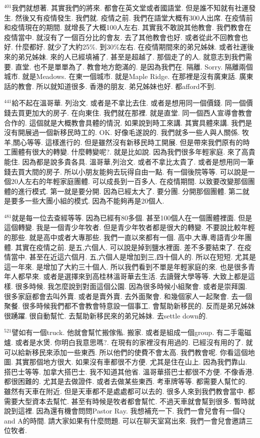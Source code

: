 \documentclass{book}
\begin{document}
$^{401}$我們就想著.
其實我們的將來.
都會在英文堂或者國語堂.
但是誰不知就有社運發生.
然後又有疫情發生.
我們就.
疫情之前.
我們在語堂大概有300人出席.
在疫情前和疫情現在的期間.
就增長了大概100人左右.
其實我不敢說其他教會.
我們教會在疫情當中.
就沒有了一個百分比的會友.
去了其他教會也好.
或者從此不回教會也好.
什麼都好.
就少了大約25\%.
到30\%左右.
在疫情期間來的弟兄姊妹.
或者社運後來的弟兄姊妹.
來的人已經填補了.
甚至是超越了.
那個走了的人.
就意志到我們需要.
直堂.
也不是單單為了.
教會地方飽滿的.
是因為我們在.
隔離.
Sorry.
隔離兩個城市.
就是Meadows.
在東一個城市.
就是Maple Ridge.
在那裡是沒有廣東話.
廣東話的教會.
所以就知道很多.
香港的朋友.
弟兄姊妹也好.
都afford不到.

$^{441}$給不起在溫哥華.
列治文.
或者是不拿比去住.
或者是想用同一個價錢.
同一個價錢去買更加大的房子.
在向東住.
我們就在那裡.
就是直堂.
同一個西人宣導會教會合作的.
這個就是大概教會具體的情況.
如果說到時工來講.
其實具體來講.
我們是沒有開展過一個新移民時工的.
OK.
好像毛遂說的.
我們就多一些人與人關係.
牧羊,關心等等.
這樣進行的.
但是雖然沒有新移民時工開展.
但是帶來我們原有的時工團體有很大的轉變.
什麼轉變呢?.
就是比如說.
因為我們很多年輕家庭.
來了高貴能住.
因為都是說多貴各具.
溫哥華,列治文.
或者不拿比太貴了.
或者是想用同一筆錢去買大間的房子.
所以小朋友能夠去玩得自由一點.
有一個後院等等.
可以說是一個20人左右的年輕家庭團體.
可以成長到一百多人.
在疫情期間.
以致要改變那個團體的進行模式.
第一就是要分開.
因為已經太大了.
要分團.
分開那個團體.
第二就是要多一些大團小組的模式.
因為不能夠再是20個人.

$^{481}$就是每一位去查經等等.
因為已經有80多個.
甚至100個人在一個團體裡面.
但是這個轉變.
我是一個青少年牧者.
但是青少年牧者都是很大的轉變.
不要說比較年輕的那些.
就是高中或者大專那些.
我們一直以來都有一個.
高中,大專,粵語青少年團體.
其實在疫情之前.
是五,六個人.
可以說是掉到鹽水裡面.
差不多要結束了.
在疫情當中.
甚至在近這六個月.
五,六個人是增加到三,四十個人的.
所以在短短.
尤其是這一年來.
是增加了大約三十個人.
所以我們看到不單是年輕家庭的來.
也是很多青年人都早來.
或者是選擇來到高桂林溫哥華去生活.
去讀聲大學等等.
大致上都是這樣.
很多時候.
我怎麼說到對面這個公園.
因為很多時候小組聚會.
或者是崇拜園.
很多家庭都會去叫外賣.
或者是賣外賣.
去外面聚會.
和幾個家人一起聚會.
去一個聚餐.
很多時候我們都不會教會特意設一個事工.
會幫助新移民的.
反而是弟兄姊妹很踴躍.
很自動幫忙.
去幫助新移民來的弟兄姊妹.
去settle down的.

$^{521}$譬如有一個truck.
他就會幫忙搬傢俬.
搬家.
或者是組成一個group.
有二手電磁爐.
或者是水煲.
你明白我意思嗎?.
在現有的家裡沒有用過的.
已經沒有用的了.
就可以給新移民來添加一些東西.
所以他們的使費不會太高.
我們教會呢.
你看這個地圖.
其實那個地方很大.
如果沒有車都很不方便.
尤其是住在山上.
因為我們靠山.
搭巴士等等.
加拿大搭巴士.
我不知道其他省.
溫哥華搭巴士都很不方便.
不像香港.
都很困難的.
尤其是去做證件.
或者去做某些東西.
考車牌等等.
都需要人幫忙的.
雖然有天車在附近.
但是天車都不是處處都可以去的.
很多人來到我們教會當中.
都需要大型資本去幫忙.
甚至有時候是牧者都會幫忙.
不過天車就會幫到很多.
暫時就說到這裡.
因為還有機會問問Pastor Ray.
我想補充一下.
我們一會兒會有一個Q and A的時間.
請大家如果有什麼問題.
可以在聊天室寫出來.
我們一會兒會邀請三位牧者.
\end{document}
